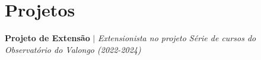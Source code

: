 \section{Projetos}
\resumeSubHeadingListStart

    \resumeProjectHeading
    {\textbf{Projeto de Extensão} $|$ \emph{Extensionista no projeto Série de cursos do Observatório do Valongo (2022-2024)}}    {}
    \resumeItemListStart
    \resumeItemListEnd


   

\resumeSubHeadingListEnd